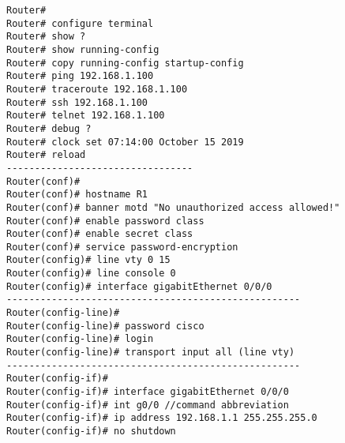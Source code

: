 \documentclass[../EngineeringJournal_CDavis.tex]{subfiles}
\begin{document}
\hspace{0.2cm}
\begin{tcolorbox}[width=6.3in]
\scriptsize 
\begin{verbatim}
Router#
Router# configure terminal
Router# show ?
Router# show running-config
Router# copy running-config startup-config
Router# ping 192.168.1.100
Router# traceroute 192.168.1.100
Router# ssh 192.168.1.100
Router# telnet 192.168.1.100
Router# debug ?
Router# clock set 07:14:00 October 15 2019
Router# reload
---------------------------------
Router(conf)#
Router(conf)# hostname R1
Router(conf)# banner motd "No unauthorized access allowed!"
Router(conf)# enable password class
Router(conf)# enable secret class
Router(conf)# service password-encryption
Router(config)# line vty 0 15
Router(config)# line console 0
Router(config)# interface gigabitEthernet 0/0/0
----------------------------------------------------
Router(config-line)#
Router(config-line)# password cisco
Router(config-line)# login
Router(config-line)# transport input all (line vty)
----------------------------------------------------
Router(config-if)#
Router(config-if)# interface gigabitEthernet 0/0/0
Router(config-if)# int g0/0 //command abbreviation
Router(config-if)# ip address 192.168.1.1 255.255.255.0
Router(config-if)# no shutdown
\end{verbatim}
\end{tcolorbox}
\hspace{0.2cm}
\normalsize  

\newpage
\end{document}
